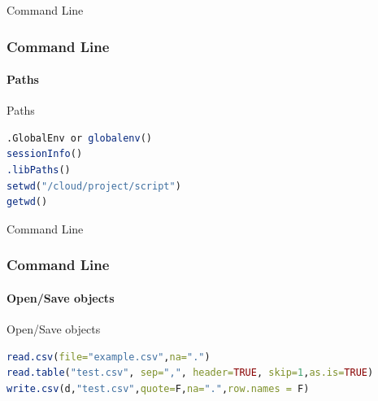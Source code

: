 \documentclass[
	11pt, %
]{beamer}
\begin{document}


\begin{frame}[fragile]{Command Line}
	\frametitle{Command Line}
	\framesubtitle{Paths} %

\begin{block}{Paths}
\begin{lstlisting}[language=R]
.GlobalEnv or globalenv()
sessionInfo()
.libPaths()
setwd("/cloud/project/script")
getwd()
\end{lstlisting}
     \vskip0pt 
	\end{block}

\end{frame}

% 

\begin{frame}[fragile]{Command Line}
	\frametitle{Command Line}
	\framesubtitle{Open/Save objects} %

\begin{block}{Open/Save objects}
\begin{lstlisting}[language=R]
read.csv(file="example.csv",na=".")
read.table("test.csv", sep=",", header=TRUE, skip=1,as.is=TRUE)
write.csv(d,"test.csv",quote=F,na=".",row.names = F)
\end{lstlisting}
     \vskip0pt 
	\end{block}

\end{frame}

\end{document}
